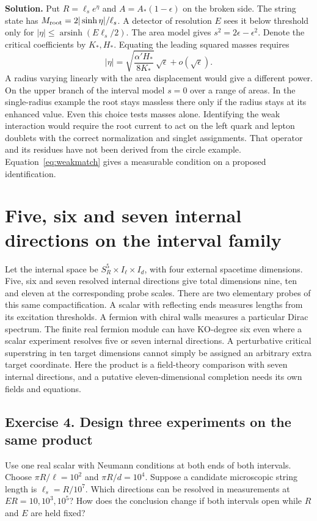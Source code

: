 \documentclass[10pt]{article}
\begin{document}
\noindent\textbf{Solution.}
Put $R=\ell_s e^\eta$ and $A=A_*(1-\epsilon)$ on the broken side. The string state has $M_{\rm root}=2|\sinh\eta|/\ell_s$. A detector of resolution $E$ sees it below threshold only for $|\eta|\leq\operatorname{arsinh}(E\ell_s/2)$. The area model gives $s^2=2\epsilon-\epsilon^2$. Denote the critical coefficients by $K_*,H_*$. Equating the leading squared masses requires
\begin{equation}
 |\eta|=\sqrt{\frac{\alpha'H_*}{8K_*}}\,\sqrt{\epsilon}
          +o(\sqrt{\epsilon}) .
 \label{eq:weakmatch}
\end{equation}
A radius varying linearly with the area displacement would give a different power. On the upper branch of the interval model $s=0$ over a range of areas. In the single-radius example the root stays massless there only if the radius stays at its enhanced value. Even this choice tests masses alone. Identifying the weak interaction would require the root current to act on the left quark and lepton doublets with the correct normalization and singlet assignments. That operator and its residues have not been derived from the circle example. Equation~\eqref{eq:weakmatch} gives a measurable condition on a proposed identification.

\section{Five, six and seven internal directions on the interval family}

Let the internal space be $S^5_R\times I_\ell\times I_d$, with four external spacetime dimensions. Five, six and seven resolved internal directions give total dimensions nine, ten and eleven at the corresponding probe scales. There are two elementary probes of this same compactification. A scalar with reflecting ends measures lengths from its excitation thresholds. A fermion with chiral walls measures a particular Dirac spectrum. The finite real fermion module can have KO-degree six even where a scalar experiment resolves five or seven internal directions. A perturbative critical superstring in ten target dimensions cannot simply be assigned an arbitrary extra target coordinate. Here the product is a field-theory comparison with seven internal directions, and a putative eleven-dimensional completion needs its own fields and equations.

\subsection{Exercise 4. Design three experiments on the same product}
Use one real scalar with Neumann conditions at both ends of both intervals. Choose $\pi R/\ell=10^2$ and $\pi R/d=10^4$. Suppose a candidate microscopic string length is $\ell_s=R/10^7$. Which directions can be resolved in measurements at $ER=10,10^3,10^5$? How does the conclusion change if both intervals open while $R$ and $E$ are held fixed?
\end{document}
